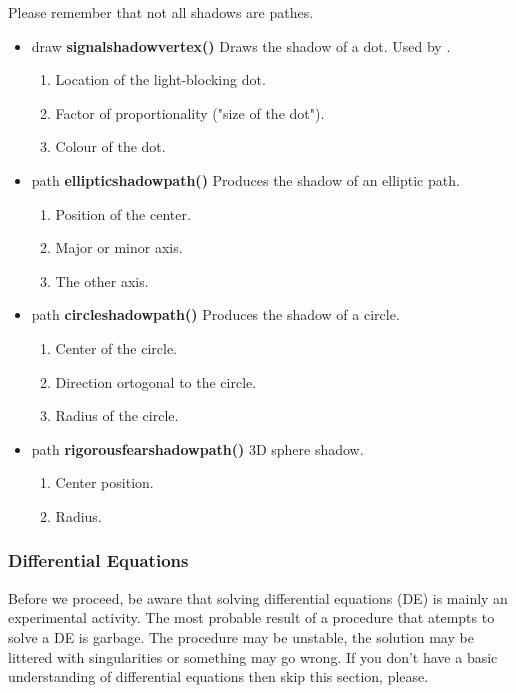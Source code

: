 Please remember that not all shadows are pathes. 
\begin{itemize}
\item draw {\bfseries signalshadowvertex()} Draws the
shadow of a  dot. Used by .
\begin{enumerate}
\item {} Location of the light-blocking dot.
\item {} Factor of proportionality
("size of the dot").
\item {} Colour of the dot.
\end{enumerate}
\item path {\bfseries ellipticshadowpath()} Produces the
shadow of an elliptic path.
\begin{enumerate}
\item {} Position of the center.
\item {} Major or minor axis.
\item {} The other axis.
\end{enumerate}
\item path {\bfseries circleshadowpath()} Produces the
shadow of a circle.
\begin{enumerate}
\item {} Center of the circle.
\item {} Direction ortogonal to
the circle.
\item {} Radius of the
circle.
\end{enumerate}
\item path {\bfseries rigorousfearshadowpath()}
3D sphere shadow.
\begin{enumerate}
\item {} Center position.
\item {} Radius.
\end{enumerate}
\end{itemize}


\subsubsection{Differential Equations}

Before we proceed, be aware that solving differential
equations (DE) is mainly an experimental activity. The most
probable result of a procedure that atempts to solve a DE
is garbage. The procedure may be unstable, the solution
may be littered with singularities or something may go
wrong. If you don't have a basic understanding of
differential equations then skip this section, please.

